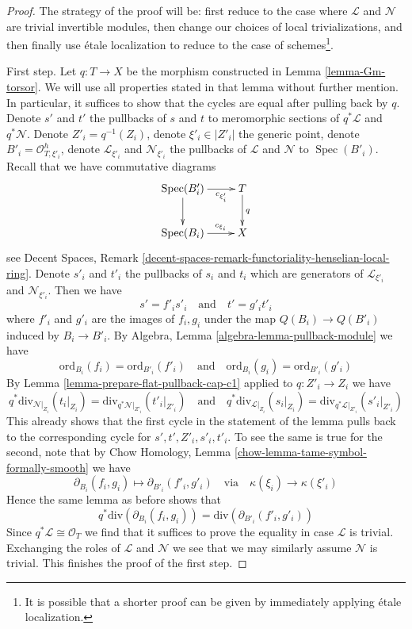 \documentclass{stacks-project}
\theoremstyle{plain}
\theoremstyle{definition}
\theoremstyle{remark}
\numberwithin{equation}{subsection}
\def\Spec{\mathop{\mathrm{Spec}}}
\begin{document}
\begin{proof}
The strategy of the proof will be: first reduce to the case where
$\mathcal{L}$ and $\mathcal{N}$ are trivial invertible modules,
then change our choices of local trivializations, and then finally
use \'etale localization to reduce to the case of schemes\footnote{It
is possible that a shorter proof can be given by immediately
applying \'etale localization.}.

\medskip\noindent
First step. Let $q : T \to X$ be the morphism constructed in
Lemma \ref{lemma-Gm-torsor}. We will use all properties stated in
that lemma without further mention. In particular, it suffices to
show that the cycles are equal after pulling back by $q$.
Denote $s'$ and $t'$ the pullbacks of $s$ and $t$ to meromorphic sections
of $q^*\mathcal{L}$ and $q^*\mathcal{N}$.
Denote $Z'_i = q^{-1}(Z_i)$, denote $\xi'_i \in |Z'_i|$ the generic point,
denote $B'_i = \mathcal{O}_{T, \xi'_i}^h$, denote
$\mathcal{L}_{\xi'_i}$ and $\mathcal{N}_{\xi'_i}$ the pullbacks
of $\mathcal{L}$ and $\mathcal{N}$ to $\Spec(B'_i)$.
Recall that we have commutative diagrams
$$
\xymatrix{
\Spec(B'_i) \ar[r]_-{c_{\xi'_i}} \ar[d] & T \ar[d]^q \\
\Spec(B_i) \ar[r]^-{c_{\xi_i}} & X
}
$$
see Decent Spaces, Remark
\ref{decent-spaces-remark-functoriality-henselian-local-ring}.
Denote $s'_i$ and $t'_i$ the pullbacks of $s_i$ and $t_i$ which
are generators of $\mathcal{L}_{\xi'_i}$ and $\mathcal{N}_{\xi'_i}$.
Then we have
$$
s' = f'_i s'_i
\quad\text{and}\quad
t' = g'_i t'_i
$$
where $f'_i$ and $g'_i$ are the images of $f_i, g_i$
under the map $Q(B_i) \to Q(B'_i)$ induced by $B_i \to B'_i$.
By Algebra, Lemma \ref{algebra-lemma-pullback-module} we have
$$
\text{ord}_{B_i}(f_i) = \text{ord}_{B'_i}(f'_i)
\quad\text{and}\quad
\text{ord}_{B_i}(g_i) = \text{ord}_{B'_i}(g'_i)
$$
By Lemma \ref{lemma-prepare-flat-pullback-cap-c1} applied
to $q : Z'_i \to Z_i$ we have
$$
q^*\text{div}_{\mathcal{N}|_{Z_i}}(t_i|_{Z_i}) =
\text{div}_{q^*\mathcal{N}|_{Z'_i}}(t'_i|_{Z'_i})
\quad\text{and}\quad
q^*\text{div}_{\mathcal{L}|_{Z_i}}(s_i|_{Z_i}) =
\text{div}_{q^*\mathcal{L}|_{Z'_i}}(s'_i|_{Z'_i})
$$
This already shows that the first cycle in the statement of the
lemma pulls back to the corresponding cycle for
$s', t', Z'_i, s'_i, t'_i$. To see the same is true for the
second, note that by
Chow Homology, Lemma \ref{chow-lemma-tame-symbol-formally-smooth} we have
$$
\partial_{B_i}(f_i, g_i) \mapsto
\partial_{B'_i}(f'_i, g'_i)
\quad\text{via}\quad
\kappa(\xi_i) \to \kappa(\xi'_i)
$$
Hence the same lemma as before shows that
$$
q^*\text{div}(\partial_{B_i}(f_i, g_i)) =
\text{div}(\partial_{B'_i}(f'_i, g'_i))
$$
Since $q^*\mathcal{L} \cong \mathcal{O}_T$ we find that it suffices
to prove the equality in case $\mathcal{L}$ is trivial.
Exchanging the roles of $\mathcal{L}$ and $\mathcal{N}$ we
see that we may similarly assume $\mathcal{N}$ is trivial.
This finishes the proof of the first step.


\end{proof}
\end{document}
